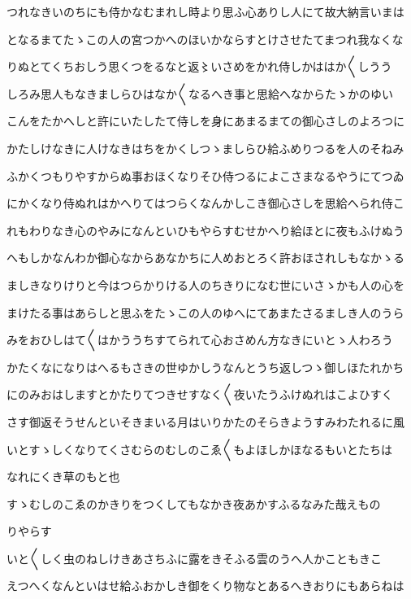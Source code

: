 \documentclass[a4paper,11pt,landscape]{ltjtarticle}
\begin{document}
\par\medskip
つれなきいのちにも侍かなむまれし時より思ふ心ありし人にて故大納言いまは
\par\medskip
となるまてたゝこの人の宮つかへのほいかならすとけさせたてまつれ我なくな
\par\medskip
りぬとてくちおしう思くつをるなと返〻いさめをかれ侍しかははか〱しうう
\par\medskip
しろみ思人もなきましらひはなか〱なるへき事と思給へなからたゝかのゆい
\par\medskip
こんをたかへしと許にいたしたて侍しを身にあまるまての御心さしのよろつに
\par\medskip
かたしけなきに人けなきはちをかくしつゝましらひ給ふめりつるを人のそねみ
\par\medskip
ふかくつもりやすからぬ事おほくなりそひ侍つるによこさまなるやうにてつゐ
\par\medskip
にかくなり侍ぬれはかへりてはつらくなんかしこき御心さしを思給へられ侍こ
\par\medskip
れもわりなき心のやみになんといひもやらすむせかへり給ほとに夜もふけぬう
\par\medskip
へもしかなんわか御心なからあなかちに人めおとろく許おほされしもなかゝる
\par\medskip
ましきなりけりと今はつらかりける人のちきりになむ世にいさゝかも人の心を
\par\medskip
まけたる事はあらしと思ふをたゝこの人のゆへにてあまたさるましき人のうら
\par\medskip
みをおひしはて〱はかううちすてられて心おさめん方なきにいとゝ人わろう
\par\medskip
かたくなになりはへるもさきの世ゆかしうなんとうち返しつゝ御しほたれかち
\par\medskip
にのみおはしますとかたりてつきせすなく〱夜いたうふけぬれはこよひすく
\par\medskip
さす御返そうせんといそきまいる月はいりかたのそらきようすみわたれるに風
\par\medskip
いとすゝしくなりてくさむらのむしのこゑ〱もよほしかほなるもいとたちは
\par\medskip
なれにくき草のもと也
\par\medskip
すゝむしのこゑのかきりをつくしてもなかき夜あかすふるなみた哉えもの
\par\medskip
りやらす
\par\medskip
いと〱しく虫のねしけきあさちふに露をきそふる雲のうへ人かこともきこ
\par\medskip
えつへくなんといはせ給ふおかしき御をくり物なとあるへきおりにもあらねは
\par\medskip
\end{document}
